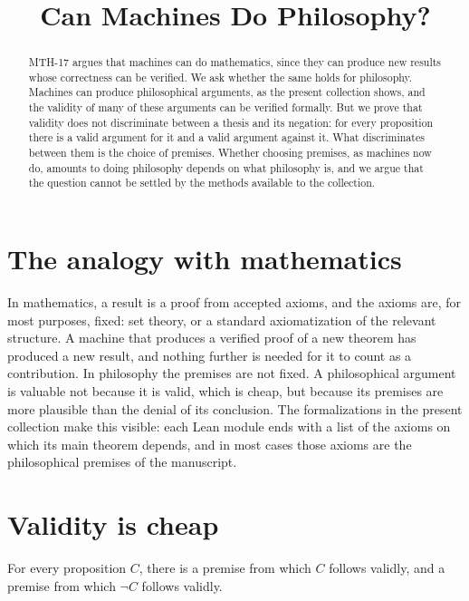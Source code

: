 \documentclass{situationist-preprint}
\title{Can Machines Do Philosophy?}
\begin{document}
\maketitle

\begin{abstract}
MTH-17 argues that machines can do mathematics, since they can produce new results whose correctness can be verified. We ask whether the same holds for philosophy. Machines can produce philosophical arguments, as the present collection shows, and the validity of many of these arguments can be verified formally. But we prove that validity does not discriminate between a thesis and its negation: for every proposition there is a valid argument for it and a valid argument against it. What discriminates between them is the choice of premises. Whether choosing premises, as machines now do, amounts to doing philosophy depends on what philosophy is, and we argue that the question cannot be settled by the methods available to the collection.
\end{abstract}

\section{The analogy with mathematics}

In mathematics, a result is a proof from accepted axioms, and the axioms are, for most purposes, fixed: set theory, or a standard axiomatization of the relevant structure. A machine that produces a verified proof of a new theorem has produced a new result, and nothing further is needed for it to count as a contribution. In philosophy the premises are not fixed. A philosophical argument is valuable not because it is valid, which is cheap, but because its premises are more plausible than the denial of its conclusion. The formalizations in the present collection make this visible: each Lean module ends with a list of the axioms on which its main theorem depends, and in most cases those axioms are the philosophical premises of the manuscript.

\section{Validity is cheap}

\begin{proposition}\label{p:both}
For every proposition $C$, there is a premise from which $C$ follows validly, and a premise from which $\neg C$ follows validly.
\end{proposition}
\end{document}
